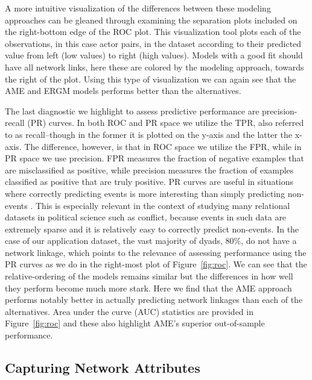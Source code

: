 \documentclass[9pt,twocolumn,twoside,lineno]{pnas-new}
\begin{document}
A more intuitive visualization of the differences between these modeling approaches can be gleaned through examining the separation plots included on the right-bottom edge of the ROC plot. This visualization tool plots each of the observations, in this case actor pairs, in the dataset according to their predicted value from left (low values) to right (high values). Models with a good fit should have all network links, here these are colored by the modeling approach, towards the right of the plot. Using this type of visualization we can again see that the AME and ERGM models performs better than the alternatives.

The last diagnostic we highlight to assess predictive performance are precision-recall (PR) curves. In both ROC and PR space we utilize the TPR, also referred to as recall--though in the former it is plotted on the y-axis and the latter the x-axis. The difference, however, is that in ROC space we utilize the FPR, while in PR space we use precision. FPR measures the fraction of negative examples that are misclassified as positive, while precision measures the fraction of examples classified as positive that are truly positive. PR curves are useful in situations where correctly predicting events is more interesting than simply predicting non-events \citep{davis:goadrich:2006}. This is especially relevant in the context of studying many relational datasets in political science such as conflict, because events in such data are extremely sparse and it is relatively easy to correctly predict non-events. In the case of our application dataset, the vast majority of dyads, 80\%, do not have a network linkage, which points to the relevance of assessing performance using the PR curves as we do in the right-most plot of Figure~\ref{fig:roc}. We can see that the relative-ordering of the models remains similar but the differences in how well they perform become much more stark. Here we find that the AME approach performs notably better in actually predicting network linkages than each of the alternatives. Area under the curve (AUC) statistics are provided in Figure~\ref{fig:roc} and these also highlight AME's superior out-of-sample performance.

\subsection*{Capturing Network Attributes}
\end{document}
